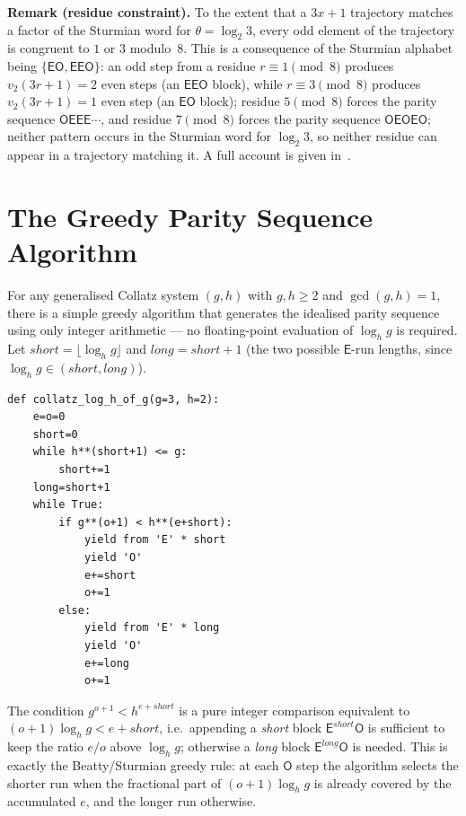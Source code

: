 \documentclass[12pt]{article}
\theoremstyle{definition}
\theoremstyle{remark}
\theoremstyle{plain}
\newcommand{\OO}{\mathsf{O}}
\newcommand{\EE}{\mathsf{E}}
\begin{document}
\medskip
\noindent\textbf{Remark (residue constraint).}
To the extent that a $3x+1$ trajectory matches a factor of the Sturmian word for
$\theta = \log_2 3$, every odd element of the trajectory is congruent to $1$ or
$3$ modulo~$8$.
This is a consequence of the Sturmian alphabet being $\{\EE\OO, \EE\EE\OO\}$:
an odd step from a residue $r \equiv 1 \pmod{8}$ produces $v_2(3r+1) = 2$ even
steps (an $\EE\EE\OO$ block), while $r \equiv 3 \pmod{8}$ produces
$v_2(3r+1) = 1$ even step (an $\EE\OO$ block); residue $5 \pmod{8}$ forces the
parity sequence $\OO\EE\EE\EE\cdots$, and residue $7 \pmod{8}$ forces the parity
sequence $\OO\EE\OO\EE\OO$; neither pattern occurs in the Sturmian word for
$\log_2 3$, so neither residue can appear in a trajectory matching it.
A full account is given in~\cite{paper33}.

\section{The Greedy Parity Sequence Algorithm}
\label{sec:greedy}

For any generalised Collatz system $(g, h)$ with $g, h \geq 2$ and $\gcd(g,h)=1$,
there is a simple greedy algorithm that generates the idealised parity sequence
using only integer arithmetic --- no floating-point evaluation of $\log_h g$ is
required.
Let $\mathit{short} = \lfloor\log_h g\rfloor$ and
$\mathit{long} = \mathit{short} + 1$ (the two possible $\EE$-run lengths, since
$\log_h g \in (\mathit{short}, \mathit{long})$).

\begin{verbatim}
def collatz_log_h_of_g(g=3, h=2):
    e=o=0
    short=0
    while h**(short+1) <= g:
        short+=1
    long=short+1
    while True:
        if g**(o+1) < h**(e+short):
            yield from 'E' * short
            yield 'O'
            e+=short
            o+=1
        else:
            yield from 'E' * long
            yield 'O'
            e+=long
            o+=1
\end{verbatim}

The condition $g^{o+1} < h^{e+\mathit{short}}$ is a pure integer comparison
equivalent to $(o+1)\log_h g < e + \mathit{short}$, i.e.\ appending a
\emph{short} block $\EE^{\mathit{short}}\OO$ is sufficient to keep the ratio
$e/o$ above $\log_h g$; otherwise a \emph{long} block $\EE^{\mathit{long}}\OO$
is needed.
This is exactly the Beatty/Sturmian greedy rule: at each $\OO$ step the algorithm
selects the shorter run when the fractional part of $(o+1)\log_h g$ is already
covered by the accumulated $e$, and the longer run otherwise.
\end{document}
